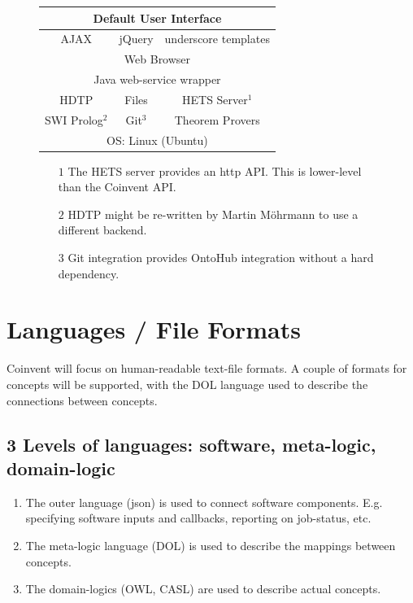 \documentclass[a4paper,twoside,11pt]{article}
\begin{document}
\begin{figure}[!h]
\begin{center}
\begin{tabular}{|c|c|c|}
\hline
\multicolumn{3}{|c|}{Default User Interface}\\
\hline
AJAX&jQuery&underscore templates\\
\hline
\multicolumn{3}{|c|}{Web Browser}\\
\hline
\multicolumn{3}{|c|}{Java web-service wrapper}\\
\hline
HDTP&Files&HETS Server$^1$\\
\hline
SWI Prolog$^2$&Git$^3$&Theorem Provers\\
\hline
\multicolumn{3}{|c|}{OS: Linux (Ubuntu)}\\
\hline
\end{tabular}
\end{center}
\begin{footnotesize}
\begin{itemize}
\item[$1$]{The HETS server provides an http API. This is lower-level than the Coinvent API.}
\item[$2$]{HDTP might be re-written by Martin Möhrmann to use a different backend.}
\item[$3$]{Git integration provides OntoHub integration without a hard dependency.}
\end{itemize}
\end{footnotesize}
\end{figure}

\section{Languages / File Formats}\label{sec:languages}

Coinvent will focus on human-readable text-file formats. 
A couple of formats for concepts will be supported, with the DOL language used to describe the connections between concepts.
\subsection{3 Levels of languages: software, meta-logic, domain-logic}
\begin{enumerate}
\item The outer language (json) is used to connect software components. E.g. specifying software inputs and callbacks, reporting on job-status, etc.
\item The meta-logic language (DOL) is used to describe the mappings between concepts.
\item The domain-logics (OWL, CASL) are used to describe actual concepts.
\end{enumerate}
\end{document}
